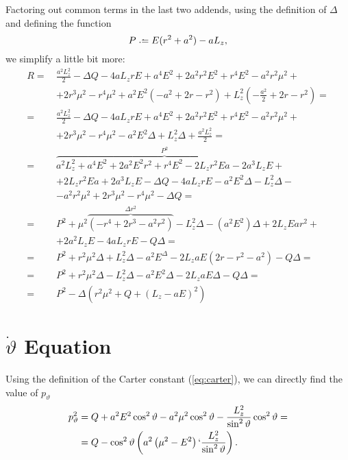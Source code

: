 Factoring out common terms in the last two addends, using the definition of $\Delta$ and defining the function
\begin{equation}
	\label{eq:defP}
	P \defeq E(r^2 + a^2) - aL_z,
\end{equation}
we simplify a little bit more:
\begin{align}
	R =\,& \frac{a^2L_z^2}{2} - \Delta Q - 4aL_zrE + a^4E^2 + 2a^2r^2E^2 + r^4E^2 - a^2r^2\mu^2 + \nonumber \\
	&+ 2r^3\mu^2 - r^4\mu^2 + a^2E^2\left(-a^2 + 2r - r^2 \right) + L_z^2\left( -\frac{a^2}{2} + 2r - r^2 \right) = \nonumber \\
	=\,& \frac{a^2L_z^2}{2} - \Delta Q - 4aL_zrE + a^4E^2 + 2a^2r^2E^2 + r^4E^2 - a^2r^2\mu^2 + \nonumber \\
	&+ 2r^3\mu^2 - r^4\mu^2 - a^2E^2\Delta + L_z^2\Delta + \frac{a^2L_z^2}{2} = \nonumber \\
	=\,& \overbrace{a^2L_z^2 + a^4E^2 + 2a^2E^2r^2 + r^4E^2 - 2L_zr^2Ea - 2a^3L_zE}^{P^2} + \nonumber\\
	&+ 2L_zr^2Ea + 2a^3L_zE - \Delta Q - 4aL_zrE - a^2E^2\Delta - L_z^2\Delta - \nonumber \\
	&- a^2r^2\mu^2 + 2r^3\mu^2 - r^4\mu^2 - \Delta Q = \nonumber \\
	=\,& P^2 + \mu^2\overbrace{\left( -r^4 + 2r^3 - a^2r^2 \right)}^{\Delta r^2} - L_z^2\Delta - (a^2E^2)\Delta + 2L_zEar^2 + \nonumber\\
	&+ 2a^2L_zE - 4aL_zrE - Q\Delta = \nonumber\\
	=\,& P^2 + r^2\mu^2\Delta + L_z^2\Delta - a^2E^\Delta - 2L_zaE\left(2r - r^2 - a^2\right) - Q\Delta = \nonumber\\
	=\,& P^2 + r^2\mu^2\Delta - L_z^2 \Delta - a^2E^2\Delta - 2L_zaE\Delta - Q\Delta = \nonumber \\
	=\,& P^2 - \Delta \left( r^2\mu^2 + Q + \left(L_z - aE \right)^2 \right)
\end{align}

\section{$\dot{\vartheta}$ Equation}

Using the definition of the Carter constant (\autoref{eq:carter}), we can directly find the value of $p_\vartheta$
\begin{align}
	p_\vartheta^2 &= Q + a^2E^2\cos^2\vartheta - a^2\mu^2\cos^2\vartheta - \frac{L_z^2}{\sin^2\vartheta}\cos^2\vartheta = \\
	&= Q - \cos^2\vartheta\left( a^2\left(\mu^2 - E^2 \right) `\frac{L_z^2}{\sin^2\vartheta} \right).
\end{align}


